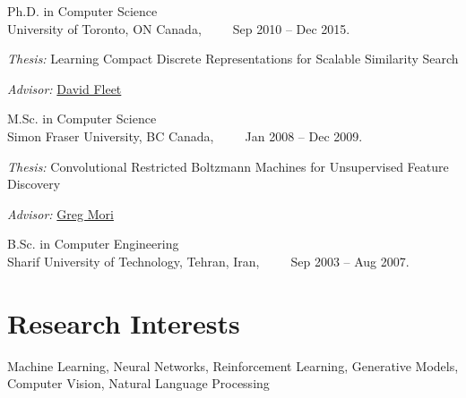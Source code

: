\documentclass[10pt,letterpaper]{article}
\renewenvironment{itemize}{
  \begin{list}{}{
    \setlength{\leftmargin}{1.5em}
  }
}{
  \end{list}
}
\begin{document}
\begin{itemize}
  \item Ph.D. in Computer Science\\
    University of Toronto, ON Canada,~~~~~Sep 2010 -- Dec 2015.
    \begin{itemize}
    \item \textit{Thesis:} Learning Compact Discrete Representations for
Scalable Similarity Search
    \item \textit{Advisor:} \href{http://www.cs.toronto.edu/~fleet/}{David Fleet}
    \end{itemize}

  \item M.Sc. in Computer Science\\
    Simon Fraser University, BC Canada,~~~~~Jan 2008 -- Dec 2009.
    \begin{itemize}
    \item \textit{Thesis:} Convolutional Restricted Boltzmann Machines for Unsupervised Feature Discovery
    \item \textit{Advisor:} \href{http://www.cs.sfu.ca/~mori/}{Greg Mori}%
    \end{itemize}

  \item B.Sc. in Computer Engineering\\
    Sharif University of Technology, Tehran, Iran,~~~~~Sep 2003 -- Aug 2007.
\end{itemize}

\section*{Research Interests}

Machine Learning, Neural Networks, Reinforcement Learning, Generative Models, Computer Vision, Natural Language Processing
\end{document}
